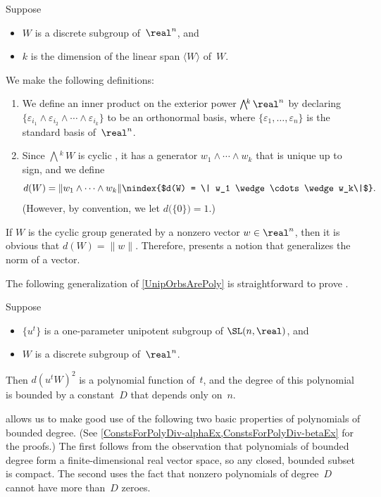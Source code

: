 \begin{defn} \label{d(W)Defn}
Suppose 
\noprelistbreak
	\begin{itemize}
	\item $W$ is a discrete subgroup of~$\real^n$, 
	and
	\item $k$ is the dimension of the linear span $\langle W \rangle$ of~$W$.
	\end{itemize}
We make the following definitions:
\noprelistbreak
	\begin{enumerate}
	\item We define an inner product on the exterior power $\bigwedge\!\!^k \, \real^n$ by declaring $\{ \varepsilon_{i_1} \wedge \varepsilon_{i_2} \wedge  \cdots \wedge \varepsilon_{i_k} \}$ to be an orthonormal basis, where $\{\varepsilon_1,\ldots,\varepsilon_n\}$ is the standard basis of~$\real^n$.
	\item \label{d(W)Defn-d(W)}
 Since $\bigwedge\!\!^k \, W$ is cyclic , it has a generator $w_1 \wedge \cdots \wedge w_k$ that is unique up to sign, and we define%
	$$ d(W) = \| w_1 \wedge \cdots \wedge w_k\| 
	\nindex{$d(W) = \| w_1 \wedge \cdots \wedge w_k\|$}. $$
(However, by convention, we let $d \bigl( \{0\} \bigr) = 1$.)
	\end{enumerate}
\end{defn}

\begin{rem} 
If $W$ is the cyclic group generated by a nonzero vector $w \in \real^n$, then it is obvious that $d(W) = \|w\|$. Therefore,  presents a notion that generalizes the norm of a vector.
\end{rem}

The following generalization of \cref{UnipOrbsArePoly} is straightforward to prove .

\begin{lem} \label{d(W)isPoly}
Suppose
\noprelistbreak
	\begin{itemize}
	\item $\{u^t\}$ is a one-parameter unipotent subgroup of\/ $\SL(n,\real)$,
	and
	\item $W$ is a discrete subgroup of\/~$\real^n$.
	\end{itemize}
Then $d(u^t W)^2$ is a polynomial function of~$t$, and the degree of this polynomial is bounded by a constant~$D$ that depends only on~$n$.
\end{lem}

 allows us to make good use of  the following two basic properties of polynomials of bounded degree.  (See \cref{ConstsForPolyDiv-alphaEx,ConstsForPolyDiv-betaEx} for the proofs.) The first follows from the observation that polynomials of bounded degree form a finite-dimensional real vector space, so any closed, bounded subset is compact. The second uses the fact that nonzero polynomials of degree~$D$ cannot have more than~$D$ zeroes.

